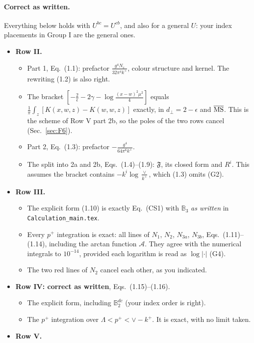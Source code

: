 \documentclass[10pt]{article}
\numberwithin{equation}{section}
\def\mf#1{\mathbb{#1}}
\begin{document}
\paragraph{Correct as written.} Everything below holds with $U^{bc}=U^{cb}$, and also for a general $U$: your index placements in Group I are the general ones.
\begin{itemize}
\item \textbf{Row II.}
\begin{itemize}
\item Part 1, Eq.~(1.1): prefactor $\frac{g^4N_c}{32\pi^4k^+}$, colour structure and kernel. The rewriting (1.2) is also right.
\item The bracket $[-\frac2\epsilon-2\gamma-\log\frac{(x-w)^2\mu^2}{4}]$ equals $\frac1\pi\int_z[K(x,w,z)-K(w,w,z)]$ exactly, in $d_\perp=2-\epsilon$ and $\overline{\rm MS}$. This is the scheme of Row V part 2b, so the poles of the two rows cancel (Sec.~\ref{sec:F6}).
\item Part 2, Eq.~(1.3): prefactor $-\frac{g^4}{64\pi^6k^+}$.
\item The split into 2a and 2b, Eqs.~(1.4)--(1.9): $\mathfrak F$, its closed form and $R^i$. This assumes the bracket contains $-k^i\log\frac{\vee}{k^+}$, which (1.3) omits (G2).
\end{itemize}
\item \textbf{Row III.}
\begin{itemize}
\item The explicit form (1.10) is exactly Eq.~(CS1) with $\mf B_3$ \emph{as written} in \texttt{Calculation\_main.tex}.
\item Every $p^+$ integration is exact: all lines of $N_1$, $N_2$, $N_{3a}$, $N_{3b}$, Eqs.~(1.11)--(1.14), including the arctan function $\mathcal A$. They agree with the numerical integrals to $10^{-14}$, provided each logarithm is read as $\log|\cdot|$ (G4).
\item The two red lines of $N_2$ cancel each other, as you indicated.
\end{itemize}
\item \textbf{Row IV: correct as written}, Eqs.~(1.15)--(1.16).
\begin{itemize}
\item The explicit form, including $\mf B_2^{dc}$ (your index order is right).
\item The $p^+$ integration over $\Lambda<p^+<\vee-k^+$. It is exact, with no limit taken.
\end{itemize}
\item \textbf{Row V.}

\end{itemize}
\end{document}

